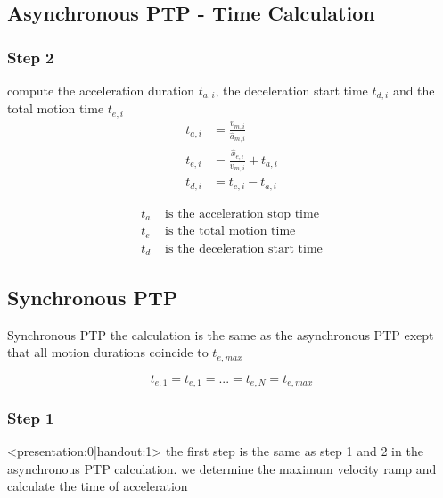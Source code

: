 \documentclass[%
  professionalfonts,%
  xcolor={%
    usenames,%
    dvipsnames,%
    svgnames,%
    table,%
    hyperref%
  }%
]{beamer}
\begin{document}
\subsection{Asynchronous PTP - Time Calculation}
\subsubsection{Step 2}
\begin{frame}
compute the acceleration duration $t_{a,i}$, the deceleration start time $t_{d,i}$ and the total motion time $t_{e,i}$
\begin{align*}
t_{a,i} & = \frac{v_{m,i}}{\hat{a}_{m,i}} \\
t_{e,i} & = \frac{\hat{x}_{e,i}}{v_{m,i}} + t_{a,i} \\
t_{d,i} & = t_{e,i} - t_{a,i}
\end{align*}

\begin{align*}
t_{a} & \text{ is the acceleration stop time} \\
t_{e} & \text{ is the total motion time} \\
t_{d} & \text{ is the deceleration start time}
\end{align*}
\end{frame}
  
\subsection{Synchronous PTP}
\begin{frame}{Synchronous PTP}
the calculation is the same as the asynchronous PTP
exept that all motion durations coincide to $t_{e,max}$

\begin{equation*}
t_{e,1} = t_{e,1} = ... = t_{e,N} = t_{e,max}
\end{equation*}
\end{frame}

\subsubsection{Step 1}
\begin{frame}<presentation:0|handout:1>
the first step is the same as step 1 and 2 in the asynchronous PTP calculation. we determine the maximum velocity ramp and  calculate the time of acceleration
\end{frame}
\end{document}

